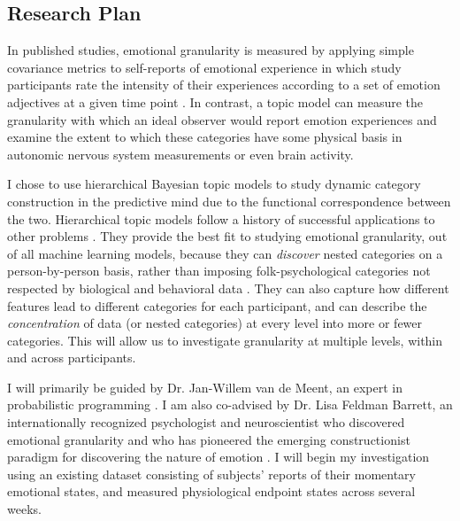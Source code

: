 
\subsection*{Research Plan}
\begin{singlespace}
In published studies, emotional granularity is measured by applying simple covariance metrics to self-reports
of emotional experience in which study participants rate the intensity of their experiences
according to a set of emotion adjectives at a given time
point \cite{10.3389/fnhum.2017.00133}. In contrast, a topic
model can measure the granularity with which an ideal observer would report emotion experiences and examine the extent to which these categories have some physical basis in autonomic nervous system measurements or even brain activity.
\end{singlespace}

\begin{singlespace}
I chose to use hierarchical Bayesian topic models to study dynamic category construction in
the predictive mind due to the functional correspondence between the two.  Hierarchical topic
models follow a history of successful applications to other problems \cite{7783636}.  They
provide the best fit to studying emotional granularity, out of all machine learning models,
because they can \emph{discover} nested categories on a person-by-person basis, rather than
imposing folk-psychological categories not respected by biological and behavioral data \cite{clark2017multivoxel,Gendron2018,Siegel2018}.
They can also capture how different features lead to different categories
for each participant, and can describe the \emph{concentration} of data (or nested categories) at every level
into more or fewer categories.  This will allow us to investigate granularity at multiple levels, within and
across participants.
\end{singlespace}

\begin{singlespace}
I will primarily be guided by Dr. Jan-Willem van de Meent, an expert in probabilistic
programming \cite{2018arXiv180910756V}.  I am also co-advised by Dr. Lisa Feldman Barrett,
an internationally recognized psychologist and neuroscientist who discovered emotional
granularity and who has pioneered the emerging constructionist paradigm for discovering
the nature of emotion \cite{BarrettTheoryOfConstructed2017}.  I will begin my investigation
using an existing dataset consisting of subjects' reports of their momentary emotional
states, and measured physiological endpoint states across several weeks.
\end{singlespace}

